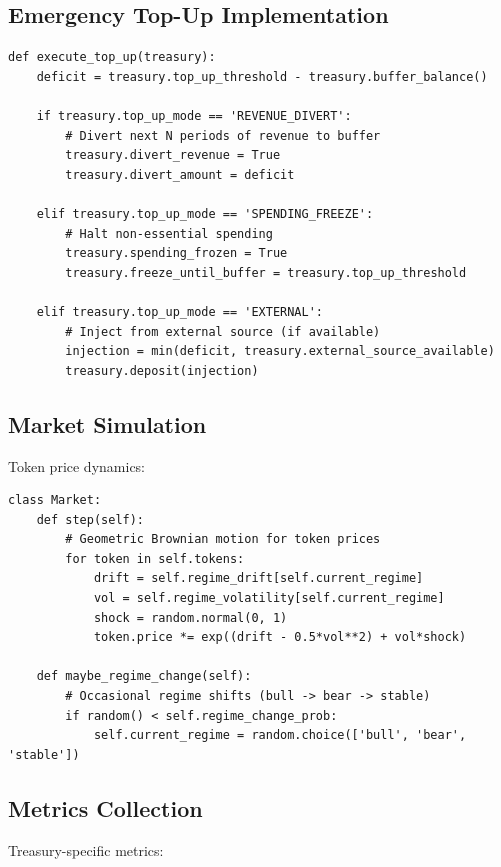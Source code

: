 \subsection{Emergency Top-Up Implementation}

\begin{lstlisting}[caption=Emergency top-up mechanism (pseudocode)]
def execute_top_up(treasury):
    deficit = treasury.top_up_threshold - treasury.buffer_balance()

    if treasury.top_up_mode == 'REVENUE_DIVERT':
        # Divert next N periods of revenue to buffer
        treasury.divert_revenue = True
        treasury.divert_amount = deficit

    elif treasury.top_up_mode == 'SPENDING_FREEZE':
        # Halt non-essential spending
        treasury.spending_frozen = True
        treasury.freeze_until_buffer = treasury.top_up_threshold

    elif treasury.top_up_mode == 'EXTERNAL':
        # Inject from external source (if available)
        injection = min(deficit, treasury.external_source_available)
        treasury.deposit(injection)
\end{lstlisting}

\subsection{Market Simulation}

Token price dynamics:

\begin{lstlisting}[caption=Market price simulation (pseudocode)]
class Market:
    def step(self):
        # Geometric Brownian motion for token prices
        for token in self.tokens:
            drift = self.regime_drift[self.current_regime]
            vol = self.regime_volatility[self.current_regime]
            shock = random.normal(0, 1)
            token.price *= exp((drift - 0.5*vol**2) + vol*shock)

    def maybe_regime_change(self):
        # Occasional regime shifts (bull -> bear -> stable)
        if random() < self.regime_change_prob:
            self.current_regime = random.choice(['bull', 'bear', 'stable'])
\end{lstlisting}

\subsection{Metrics Collection}

Treasury-specific metrics:

